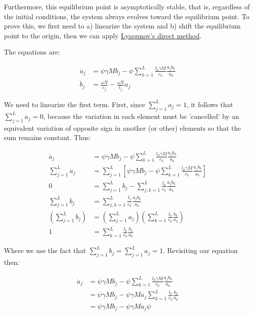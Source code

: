 Furthermore, this equilibrium point is asymptotically stable, that is, regardless of the initial conditions, the system always evolves toward the equilibrium point. To prove this, we first need to a) linearize the system and b) shift the equilibrium point to the origin, then we can apply \href{https://eng.libretexts.org/Bookshelves/Industrial_and_Systems_Engineering/Book\%3A_Dynamic_Systems_and_Control_\%28Dahleh_Dahleh_and_Verghese\%29/13\%3A_Internal_\%28Lyapunov\%29_Stability/13.03\%3A_Lyapunov\%27s_Direct_Method}{Lyapunov's direct method}. 

The equations are:


\begin{align*}
\dot{a}_{j} & =\psi\gamma Mb_{j}-\psi\sum_{k=1}^{L}\frac{l_{k}\gamma M}{c_{k}}\frac{a_{j}b_{k}}{a_{k}}\\
\dot{b}_{j} & =\frac{\omega N}{c_{j}}-\frac{\omega N}{l_{j}}a_{j}
\end{align*}

We need to linearize the first term. First, since $\sum_{j=1}^{L}a_{j}=1$, it follows that $\sum_{j=1}^{L}\dot{a}_{j}=0$, because the variation in each element must be 'cancelled' by an equivalent variation of opposite sign in another (or other) elements so that the sum remains constant. Thus:


\begin{align*}
\dot{a}_{j} & =\psi\gamma Mb_{j}-\psi\sum_{k=1}^{L}\frac{l_{k}\gamma M}{c_{k}}\frac{a_{j}b_{k}}{a_{k}}\\
\sum_{j=1}^{L}\dot{a}_{j} & =\sum_{j=1}^{L}\left[\psi\gamma Mb_{j}-\psi\sum_{k=1}^{L}\frac{l_{k}\gamma M}{c_{k}}\frac{a_{j}b_{k}}{a_{k}}\right]\\
0 & =\sum_{j=1}^{L} b_{j}-\sum_{j,k=1}^{L}\frac{l_{k}}{c_{k}}\frac{a_{j}b_{k}}{a_{k}}\\
\sum_{j=1}^{L}b_{j} & =\sum_{j,k=1}^{L}\frac{l_{j}}{c_{k}}\frac{a_{j}b_{k}}{a_{k}}\\
\left(\sum_{j=1}^{L}b_{j}\right) & =\left(\sum_{j=1}^{L}a_{j}\right)\left(\sum_{k=1}^{L}\frac{l_{k}}{c_{k}}\frac{b_{k}}{a_{k}}\right)\\
1 & =\sum_{k=1}^{L}\frac{l_{k}}{c_{k}}\frac{b_{k}}{a_{k}}
\end{align*}

Where we use the fact that $\sum_{j=1}^{L}b_{j}=\sum_{j=1}^{L}a_{j}=1$.  
Revisiting our equation then:


\begin{align*}
\dot{a}_{j} & =\psi\gamma Mb_{j}-\psi\sum_{k=1}^{L}\frac{l_{k}\gamma M}{c_{k}}\frac{a_{j}b_{k}}{a_{k}}\\
 & =\psi\gamma Mb_{j}-\psi\gamma Ma_{j}\sum_{k=1}^{L}\frac{l_{k}}{c_{k}}\frac{b_{k}}{a_{k}}\\
 & =\psi\gamma Mb_{j}-\psi\gamma Ma_{j}\psi
\end{align*}

